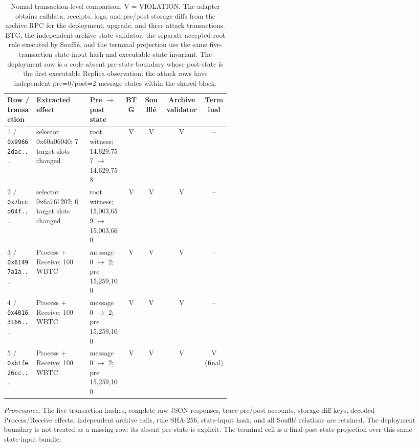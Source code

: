 \begin{table}[t]\centering\scriptsize\setlength{\tabcolsep}{3pt}
\caption{Nomad transaction-level comparison. V = VIOLATION. The adapter obtains calldata, receipts, logs, and pre/post storage diffs from the archive RPC for the deployment, upgrade, and three attack transactions. BTG, the independent archive-state validator, the separate accepted-root rule executed by Souffl\'e, and the terminal projection use the same five-transaction state-input hash and executable-state invariant. The deployment row is a code-absent pre-state boundary whose post-state is the first executable Replica observation; the attack rows have independent pre=0/post=2 message states within the shared block.}
\label{tab:nomad-attack}
\begin{tabular}{@{}p{0.13\linewidth}p{0.24\linewidth}p{0.16\linewidth}cccc@{}}\toprule
Row / transaction & Extracted effect & Pre $\rightarrow$ post state & BTG & Souffl\'e & Archive validator & Terminal \\ \midrule
1 / \texttt{0x99662dac...} & selector 0x60a06040; 7 target slots changed & root witness; 14,629,757 $\rightarrow$ 14,629,758 & V & V & V & -- \\
2 / \texttt{0x7bccd64f...} & selector 0x6a761202; 0 target slots changed & root witness; 15,003,659 $\rightarrow$ 15,003,660 & V & V & V & -- \\
3 / \texttt{0x61497a1a...} & Process + Receive; 100 WBTC & message 0 $\rightarrow$ 2; pre 15,259,100 & V & V & V & -- \\
4 / \texttt{0x40163166...} & Process + Receive; 100 WBTC & message 0 $\rightarrow$ 2; pre 15,259,100 & V & V & V & -- \\
5 / \texttt{0xb1fe26cc...} & Process + Receive; 100 WBTC & message 0 $\rightarrow$ 2; pre 15,259,100 & V & V & V & V (final) \\
\bottomrule
\end{tabular}
\par\smallskip\parbox{0.97\linewidth}{\textit{Provenance.} The five transaction hashes, complete raw JSON responses, trace pre/post accounts, storage-diff keys, decoded Process/Receive effects, independent archive calls, rule SHA-256, state-input hash, and all Souffl\'e relations are retained. The deployment boundary is not treated as a missing row: its absent pre-state is explicit. The terminal cell is a final-post-state projection over this same state-input bundle.}
\end{table}
